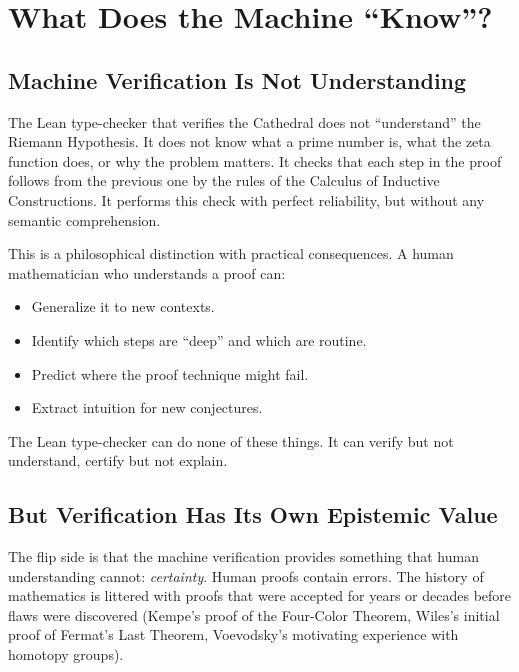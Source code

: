 \documentclass[11pt,a4paper]{article}
\begin{document}
\section{What Does the Machine ``Know''?}
\label{sec:knowledge}

\subsection{Machine Verification Is Not Understanding}

The Lean type-checker that verifies the Cathedral does not
``understand'' the Riemann Hypothesis. It does not know what a prime
number is, what the zeta function does, or why the problem matters.
It checks that each step in the proof follows from the previous one
by the rules of the Calculus of Inductive Constructions. It performs
this check with perfect reliability, but without any semantic
comprehension.

This is a philosophical distinction with practical consequences.
A human mathematician who understands a proof can:

\begin{itemize}
  \item Generalize it to new contexts.
  \item Identify which steps are ``deep'' and which are routine.
  \item Predict where the proof technique might fail.
  \item Extract intuition for new conjectures.
\end{itemize}

The Lean type-checker can do none of these things. It can verify but
not understand, certify but not explain.

\subsection{But Verification Has Its Own Epistemic Value}

The flip side is that the machine verification provides something
that human understanding cannot: \emph{certainty}. Human proofs
contain errors. The history of mathematics is littered with proofs
that were accepted for years or decades before flaws were discovered
(Kempe's proof of the Four-Color Theorem, Wiles's initial proof of
Fermat's Last Theorem, Voevodsky's motivating experience with
homotopy groups).
\end{document}
